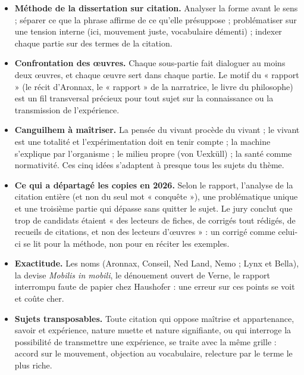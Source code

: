 \documentclass[11pt,a4paper]{article}
\providecommand{\tightlist}{\setlength{\itemsep}{0pt}\setlength{\parskip}{0pt}}
\begin{document}
\begin{itemize}
\tightlist
\item
  \textbf{Méthode de la dissertation sur citation.} Analyser la forme avant le sens ; séparer ce que la phrase affirme de ce qu'elle présuppose ; problématiser sur une tension interne (ici, mouvement juste, vocabulaire démenti) ; indexer chaque partie sur des termes de la citation.
\item
  \textbf{Confrontation des œuvres.} Chaque sous-partie fait dialoguer au moins deux œuvres, et chaque œuvre sert dans chaque partie. Le motif du « rapport » (le récit d'Aronnax, le « rapport » de la narratrice, le livre du philosophe) est un fil transversal précieux pour tout sujet sur la connaissance ou la transmission de l'expérience.
\item
  \textbf{Canguilhem à maîtriser.} La pensée du vivant procède du vivant ; le vivant est une totalité et l'expérimentation doit en tenir compte ; la machine s'explique par l'organisme ; le milieu propre (von Uexküll) ; la santé comme normativité. Ces cinq idées s'adaptent à presque tous les sujets du thème.
\item
  \textbf{Ce qui a départagé les copies en 2026.} Selon le rapport, l'analyse de la citation entière (et non du seul mot « conquête »), une problématique unique et une troisième partie qui dépasse sans quitter le sujet. Le jury conclut que trop de candidats étaient « des lecteurs de fiches, de corrigés tout rédigés, de recueils de citations, et non des lecteurs d'œuvres » : un corrigé comme celui-ci se lit pour la méthode, non pour en réciter les exemples.
\item
  \textbf{Exactitude.} Les noms (Aronnax, Conseil, Ned Land, Nemo ; Lynx et Bella), la devise \emph{Mobilis in mobili}, le dénouement ouvert de Verne, le rapport interrompu faute de papier chez Haushofer : une erreur sur ces points se voit et coûte cher.
\item
  \textbf{Sujets transposables.} Toute citation qui oppose maîtrise et appartenance, savoir et expérience, nature muette et nature signifiante, ou qui interroge la possibilité de transmettre une expérience, se traite avec la même grille : accord sur le mouvement, objection au vocabulaire, relecture par le terme le plus riche.
\end{itemize}
\end{document}

